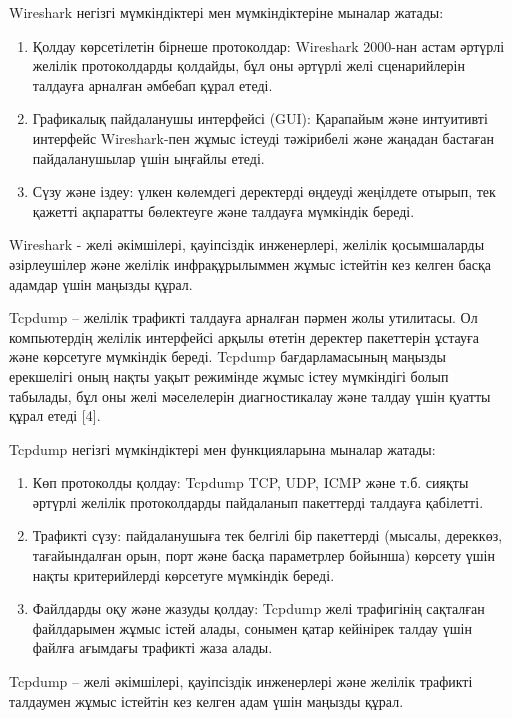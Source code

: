 Wireshark негізгі мүмкіндіктері мен мүмкіндіктеріне мыналар жатады:

\begin{enumerate}
\def\labelenumi{\arabic{enumi}.}
\item
  Қолдау көрсетілетін бірнеше протоколдар: Wireshark 2000-нан астам
  әртүрлі желілік протоколдарды қолдайды, бұл оны әртүрлі желі
  сценарийлерін талдауға арналған әмбебап құрал етеді.
\item
  Графикалық пайдаланушы интерфейсі (GUI): Қарапайым және интуитивті
  интерфейс Wireshark-пен жұмыс істеуді тәжірибелі және жаңадан бастаған
  пайдаланушылар үшін ыңғайлы етеді.
\item
  Сүзу және іздеу: үлкен көлемдегі деректерді өңдеуді жеңілдете отырып,
  тек қажетті ақпаратты бөлектеуге және талдауға мүмкіндік береді.
\end{enumerate}

Wireshark - желі әкімшілері, қауіпсіздік инженерлері, желілік
қосымшаларды әзірлеушілер және желілік инфрақұрылыммен жұмыс істейтін
кез келген басқа адамдар үшін маңызды құрал.

Tcpdump -- желілік трафикті талдауға арналған пәрмен жолы утилитасы. Ол
компьютердің желілік интерфейсі арқылы өтетін деректер пакеттерін
ұстауға және көрсетуге мүмкіндік береді. Tcpdump бағдарламасының маңызды
ерекшелігі оның нақты уақыт режимінде жұмыс істеу мүмкіндігі болып
табылады, бұл оны желі мәселелерін диагностикалау және талдау үшін
қуатты құрал етеді {[}4{]}.

Tcpdump негізгі мүмкіндіктері мен функцияларына мыналар жатады:

\begin{enumerate}
\def\labelenumi{\arabic{enumi}.}
\item
  Көп протоколды қолдау: Tcpdump TCP, UDP, ICMP және т.б. сияқты әртүрлі
  желілік протоколдарды пайдаланып пакеттерді талдауға қабілетті.
\item
  Трафикті сүзу: пайдаланушыға тек белгілі бір пакеттерді (мысалы,
  дереккөз, тағайындалған орын, порт және басқа параметрлер бойынша)
  көрсету үшін нақты критерийлерді көрсетуге мүмкіндік береді.
\item
  Файлдарды оқу және жазуды қолдау: Tcpdump желі трафигінің сақталған
  файлдарымен жұмыс істей алады, сонымен қатар кейінірек талдау үшін
  файлға ағымдағы трафикті жаза алады.
\end{enumerate}

Tcpdump -- желі әкімшілері, қауіпсіздік инженерлері және желілік
трафикті талдаумен жұмыс істейтін кез келген адам үшін маңызды құрал.

